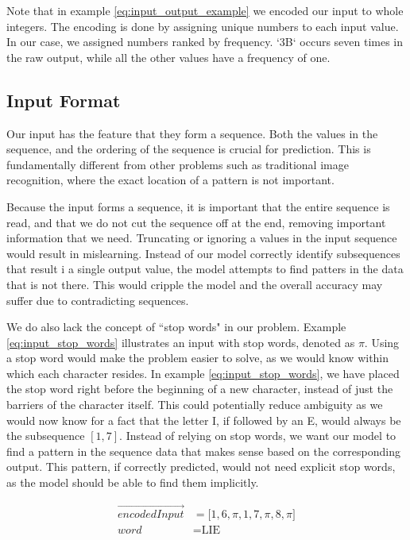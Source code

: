 Note that in example \ref{eq:input_output_example} we encoded our input to whole integers. The encoding is done by assigning unique numbers to each input value. In our case, we assigned numbers ranked by frequency. `3B` occurs seven times in the raw output, while all the other values have a frequency of one.

\subsection{Input Format}
Our input has the feature that they form a sequence. Both the values in the sequence, and the ordering of the sequence is crucial for prediction. This is fundamentally different from other problems such as traditional image recognition, where the exact location of a pattern is not important.

Because the input forms a sequence, it is important that the entire sequence is read, and that we do not cut the sequence off at the end, removing important information that we need. Truncating or ignoring a values in the input sequence would result in mislearning. Instead of our model correctly identify subsequences that result i a single output value, the model attempts to find patters in the data that is not there. This would cripple the model and the overall accuracy may suffer due to contradicting sequences.

We do also lack the concept of ``stop words" in our problem. Example \ref{eq:input_stop_words} illustrates an input with stop words, denoted as $\pi$. Using a stop word would make the problem easier to solve, as we would know within which  each character resides. In example \ref{eq:input_stop_words}, we have placed the stop word right before the beginning of a new character, instead of just the barriers of the character itself. This could potentially reduce ambiguity as we would now know for a fact that the letter I, if followed by an E, would always be the subsequence $[1, 7]$. Instead of relying on stop words, we want our model to find a pattern in the sequence data that makes sense based on the corresponding output. This pattern, if correctly predicted,
would not need explicit stop words, as the model should be able to find them implicitly.

\begin{equation}
    \label{eq:input_stop_words}
    \begin{aligned}
       \vec{encodedInput}        &= \lbrack 1, 6, \pi, 1, 7, \pi, 8, \pi \rbrack \\
       word                      &= \text{LIE}
    \end{aligned}
\end{equation}

